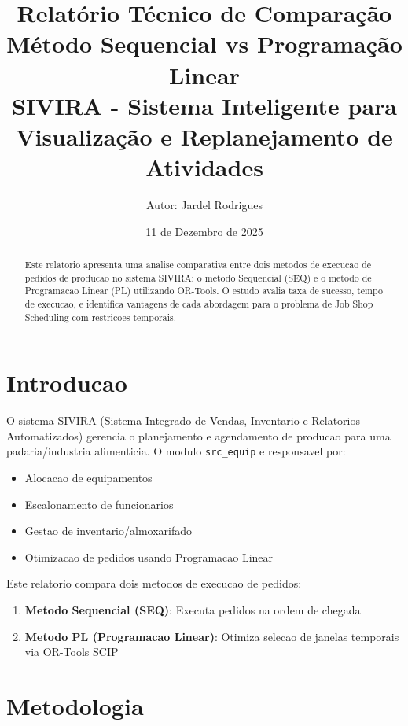 \documentclass[12pt,a4paper]{article}
\title{
    \textbf{Relatório Técnico de Comparação}\\
    \Large Método Sequencial vs Programação Linear\\
    \large SIVIRA - Sistema Inteligente para Visualização e Replanejamento de Atividades
}
\author{
    Autor: Jardel Rodrigues
}
\date{11 de Dezembro de 2025}
\begin{document}
\maketitle

\begin{abstract}
Este relatorio apresenta uma analise comparativa entre dois metodos de execucao de pedidos de producao no sistema SIVIRA: o metodo Sequencial (SEQ) e o metodo de Programacao Linear (PL) utilizando OR-Tools. O estudo avalia taxa de sucesso, tempo de execucao, e identifica vantagens de cada abordagem para o problema de Job Shop Scheduling com restricoes temporais.
\end{abstract}

\tableofcontents
\newpage

\section{Introducao}

O sistema SIVIRA (Sistema Integrado de Vendas, Inventario e Relatorios Automatizados) gerencia o planejamento e agendamento de producao para uma padaria/industria alimenticia. O modulo \texttt{src\_equip} e responsavel por:

\begin{itemize}
    \item Alocacao de equipamentos
    \item Escalonamento de funcionarios
    \item Gestao de inventario/almoxarifado
    \item Otimizacao de pedidos usando Programacao Linear
\end{itemize}

Este relatorio compara dois metodos de execucao de pedidos:

\begin{enumerate}
    \item \textbf{Metodo Sequencial (SEQ)}: Executa pedidos na ordem de chegada
    \item \textbf{Metodo PL (Programacao Linear)}: Otimiza selecao de janelas temporais via OR-Tools SCIP
\end{enumerate}

\section{Metodologia}
\end{document}
